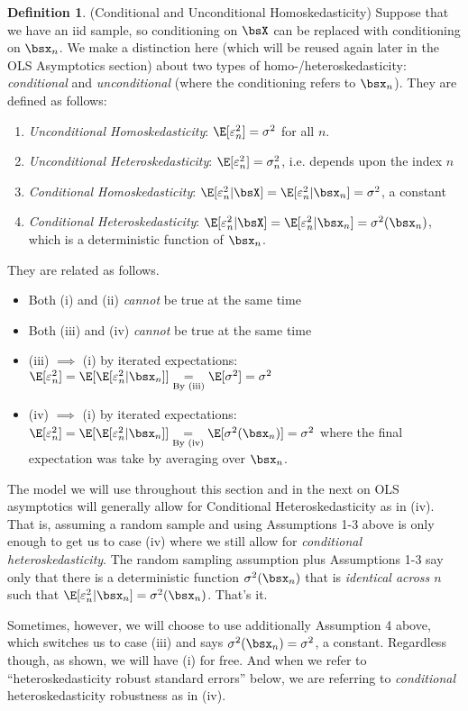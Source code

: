 \documentclass[12pt]{article}
\theoremstyle{plain}
\theoremstyle{definition}
\newtheorem{defn}[thm]{Definition}
\theoremstyle{remark}
\begin{document}
\begin{defn}(Conditional and Unconditional Homoskedasticity)
Suppose that we have an iid sample, so conditioning on $\bsX$ can be
replaced with conditioning on $\bsx_n$.
We make a distinction here (which will be reused again later in the OLS
Asymptotics section) about two types of homo-/heteroskedasticity:
\emph{conditional} and \emph{unconditional} (where the conditioning
refers to $\bsx_n$). They are defined as follows:
\begin{enumerate}[label=(\roman*)]
  \item \emph{Unconditional Homoskedasticity}:
    $\E[\varepsilon_n^2] = \sigma^2$ for all $n$.
  \item \emph{Unconditional Heteroskedasticity}:
    $\E[\varepsilon_n^2] = \sigma^2_n$, i.e. depends upon the index $n$
  \item \emph{Conditional Homoskedasticity}:
    $\E[\varepsilon_n^2 | \bsX]
    =\E[\varepsilon_n^2 | \bsx_n] = \sigma^2$, a constant
  \item \emph{Conditional Heteroskedasticity}:
    $\E[\varepsilon_n^2 | \bsX] =\E[\varepsilon_n^2 | \bsx_n] =
    \sigma^2(\bsx_n)$, which is a deterministic function of $\bsx_n$.
\end{enumerate}
They are related as follows.
\begin{itemize}
  \item Both (i) and (ii) \emph{cannot} be true at the same time
  \item Both (iii) and (iv) \emph{cannot} be true at the same time
  \item (iii) $\implies$ (i) by iterated expectations:
    $\E[\varepsilon_n^2]=
    \E[\E[\varepsilon_n^2|\bsx_n]]
    \underset{\text{By (iii)}}{=}
    \E[\sigma^2] = \sigma^2$

  \item (iv) $\implies$ (i) by iterated expectations:
    $\E[\varepsilon_n^2]=
    \E[\E[\varepsilon_n^2|\bsx_n]]
    \underset{\text{By (iv)}}{=}
    \E[\sigma^2(\bsx_n)] = \sigma^2$
    where the final expectation was take by averaging over $\bsx_n$.
\end{itemize}
The model we will use throughout this section and in the next on OLS
asymptotics will generally allow for Conditional Heteroskedasticity as
in (iv). That is, assuming a random sample and using Assumptions 1-3
above is only enough to get us to case (iv) where we still allow for
\emph{conditional heteroskedasticity}. The random sampling assumption
plus Assumptions 1-3 say only that there is a deterministic function
$\sigma^2(\bsx_n)$ that is \emph{identical across $n$} such that
$\E[\varepsilon_n^2|\bsx_n]=\sigma^2(\bsx_n)$. That's it.

Sometimes, however, we will choose to use additionally Assumption 4
above, which switches us to case (iii) and says
$\sigma^2(\bsx_n)=\sigma^2$, a constant. Regardless though, as shown, we
will have (i) for free. And when we refer to ``heteroskedasticity robust
standard errors'' below, we are referring to \emph{conditional}
heteroskedasticity robustness as in (iv).
\end{defn}
\end{document}
